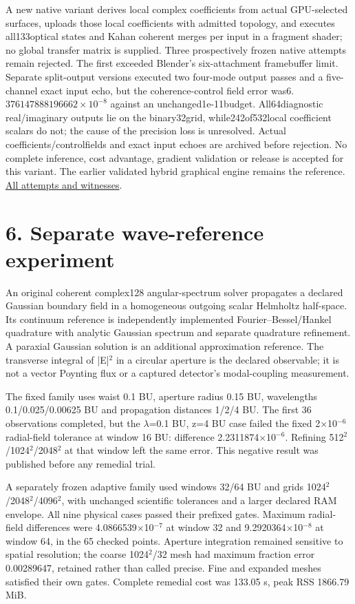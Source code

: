 \documentclass[11pt]{article}
\begin{document}
A new native variant derives local complex coefficients from actual GPU-selected surfaces, uploads those local coefficients with admitted topology, and executes all133optical states and Kahan coherent merges per input in a fragment shader; no global transfer matrix is supplied. Three prospectively frozen native attempts remain rejected. The first exceeded Blender's six-attachment framebuffer limit. Separate split-output versions executed two four-mode output passes and a five-channel exact input echo, but the coherence-control field error was6.$376147888196662\times10^{-8}$ against an unchanged1e-11budget. All64diagnostic real/imaginary outputs lie on the binary32grid, while242of532local coefficient scalars do not; the cause of the precision loss is unresolved. Actual coefficients/controlfields and exact input echoes are archived before rejection. No complete inference, cost advantage, gradient validation or release is accepted for this variant. The earlier validated hybrid graphical engine remains the reference. \href{https://github.com/Agnuxo1/Neuro3D/blob/a6d0fbec5011bdc76abad71edac86519016348f4/Docs/NATIVE\_RESIDENT\_OPTICAL\_GRAPH\_PROTOCOL\_2026-10-09.md}{All attempts and witnesses}.

\section*{6. Separate wave-reference experiment}

An original coherent complex128 angular-spectrum solver propagates a declared Gaussian boundary field in a homogeneous outgoing scalar Helmholtz half-space. Its continuum reference is independently implemented Fourier--Bessel/Hankel quadrature with analytic Gaussian spectrum and separate quadrature refinement. A paraxial Gaussian solution is an additional approximation reference. The transverse integral of |E|$^{2}$ in a circular aperture is the declared observable; it is not a vector Poynting flux or a captured detector's modal-coupling measurement.

The fixed family uses waist 0.1 BU, aperture radius 0.15 BU, wavelengths 0.1/0.025/0.00625 BU and propagation distances 1/2/4 BU. The first 36 observations completed, but the $\lambda$=0.1 BU, z=4 BU case failed the fixed 2$\times$10$^{-6}$ radial-field tolerance at window 16 BU: difference 2.2311874$\times$10$^{-6}$. Refining 512$^{2}$/1024$^{2}$/2048$^{2}$ at that window left the same error. This negative result was published before any remedial trial.

A separately frozen adaptive family used windows 32/64 BU and grids 1024$^{2}$/2048$^{2}$/4096$^{2}$, with unchanged scientific tolerances and a larger declared RAM envelope. All nine physical cases passed their prefixed gates. Maximum radial-field differences were 4.0866539$\times$10$^{-7}$ at window 32 and 9.2920364$\times$10$^{-8}$ at window 64, in the 65 checked points. Aperture integration remained sensitive to spatial resolution; the coarse 1024$^{2}$/32 mesh had maximum fraction error 0.00289647, retained rather than called precise. Fine and expanded meshes satisfied their own gates. Complete remedial cost was 133.05 s, peak RSS 1866.79 MiB.
\end{document}
